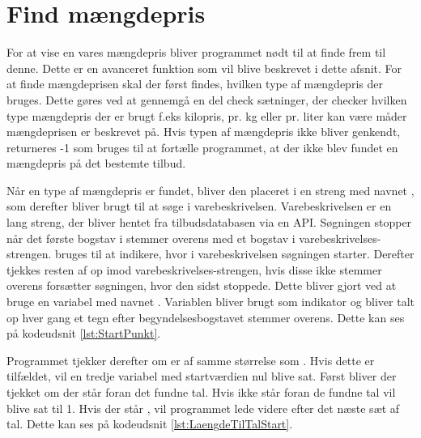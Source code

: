 \section{Find mængdepris}
For at vise en vares mængdepris bliver programmet nødt til at finde frem til denne. Dette er en avanceret funktion som vil blive beskrevet i dette afsnit.
For at finde mængdeprisen skal der først findes, hvilken type af mængdepris der bruges. Dette gøres ved at gennemgå en del check sætninger, der checker hvilken type mængdepris der er brugt f.eks kilopris, pr. kg eller pr. liter kan være måder mængdeprisen er beskrevet på. Hvis typen af mængdepris ikke bliver genkendt, returneres -1 som bruges til at fortælle programmet, at der ikke blev fundet en mængdepris på det bestemte tilbud.


Når en type af mængdepris er fundet, bliver den placeret i en streng med navnet , som derefter bliver brugt til at søge i varebeskrivelsen. Varebeskrivelsen er en lang streng, der bliver hentet fra tilbudsdatabasen via en API. Søgningen stopper når det første bogstav i  stemmer overens med et bogstav i varebeskrivelses-strengen.  bruges til at indikere, hvor i varebeskrivelsen søgningen starter.
Derefter tjekkes resten af  op imod varebeskrivelses-strengen, hvis disse ikke stemmer overens forsætter søgningen, hvor den sidst stoppede. Dette bliver gjort ved at bruge en variabel med navnet . Variablen bliver brugt som indikator og bliver talt op hver gang et tegn efter begyndelsesbogstavet stemmer overens. Dette kan ses på kodeudsnit \ref{lst:StartPunkt}.


Programmet tjekker derefter om  er af samme størrelse som . Hvis dette er tilfældet, vil en tredje variabel  med startværdien nul blive sat. 
Først bliver der tjekket om der står  foran det fundne tal. Hvis  ikke står foran de fundne tal vil  blive sat til 1. Hvis der står , vil programmet lede videre efter det næste sæt af tal. Dette kan ses på kodeudsnit \ref{lst:LaengdeTilTalStart}.



